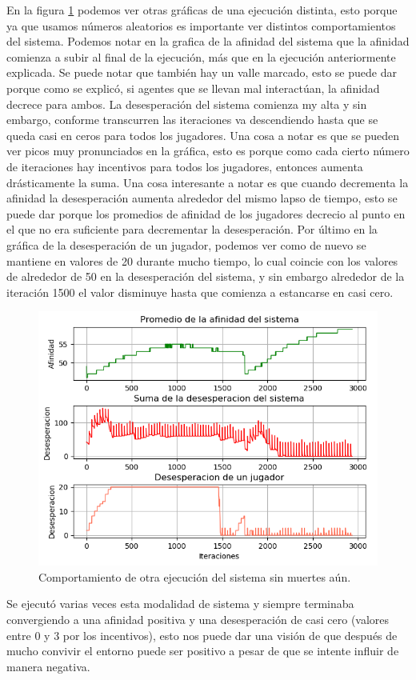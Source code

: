 \documentclass[11pt,letterpaper]{article}
\begin{document}
En la figura \ref{fig:graficasit2snmuertes} podemos ver otras gráficas de una ejecución distinta, esto porque ya que usamos números aleatorios es importante 
ver distintos comportamientos del sistema. 
Podemos notar en la grafica de la afinidad del sistema que la afinidad comienza a 
subir al final de la ejecución, más que en la ejecución anteriormente explicada. 
Se puede notar que también hay un valle marcado, esto se puede dar porque como se 
explicó, si agentes que se llevan mal interactúan, la afinidad decrece para ambos. 
La desesperación del sistema comienza my alta y sin embargo, conforme transcurren 
las iteraciones va descendiendo hasta que se queda casi en ceros para todos los 
jugadores. Una cosa a notar es que se pueden ver picos muy pronunciados en la 
gráfica, esto es porque como cada cierto número de iteraciones hay incentivos para
todos los jugadores, entonces aumenta drásticamente la suma. Una cosa interesante a 
notar es que cuando decrementa la afinidad la desesperación aumenta alrededor del 
mismo lapso de tiempo, esto se puede dar porque los promedios de afinidad de los
jugadores decrecio al punto en el que no era suficiente para decrementar la 
desesperación.
Por último en la gráfica de la desesperación de un jugador, podemos ver como de nuevo se mantiene en valores de 20 durante mucho tiempo, lo cual coincie con los valores de alrededor de 50 en la desesperación del sistema, y sin embargo alrededor
de la iteración 1500 el valor disminuye hasta que comienza a estancarse en casi cero.

\begin{figure}[h!]
	\centering
	\includegraphics[width=0.7\linewidth]{Graficas_It_2_snMuertes}
	\caption{Comportamiento de otra ejecución del sistema sin muertes aún.}
	\label{fig:graficasit2snmuertes}
\end{figure}

Se ejecutó varias veces esta modalidad de sistema y siempre terminaba convergiendo
a una afinidad positiva y una desesperación de casi cero (valores entre 0 y 3 por 
los incentivos), esto nos puede dar una visión de que después de mucho convivir el entorno puede ser positivo a pesar de que se intente influir de manera negativa.
\end{document}
